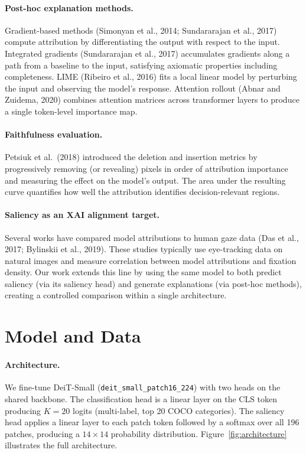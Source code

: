 \documentclass{article}
\begin{document}
\paragraph{Post-hoc explanation methods.}
Gradient-based methods (Simonyan et al., 2014; Sundararajan et al., 2017) compute attribution by differentiating the output with respect to the input. Integrated gradients (Sundararajan et al., 2017) accumulates gradients along a path from a baseline to the input, satisfying axiomatic properties including completeness. LIME (Ribeiro et al., 2016) fits a local linear model by perturbing the input and observing the model's response. Attention rollout (Abnar and Zuidema, 2020) combines attention matrices across transformer layers to produce a single token-level importance map.

\paragraph{Faithfulness evaluation.}
Petsiuk et al.\ (2018) introduced the deletion and insertion metrics by progressively removing (or revealing) pixels in order of attribution importance and measuring the effect on the model's output. The area under the resulting curve quantifies how well the attribution identifies decision-relevant regions.

\paragraph{Saliency as an XAI alignment target.}
Several works have compared model attributions to human gaze data (Das et al., 2017; Bylinskii et al., 2019). These studies typically use eye-tracking data on natural images and measure correlation between model attributions and fixation density. Our work extends this line by using the same model to both predict saliency (via its saliency head) and generate explanations (via post-hoc methods), creating a controlled comparison within a single architecture.

\section{Model and Data}

\paragraph{Architecture.}
We fine-tune DeiT-Small (\texttt{deit\_small\_patch16\_224}) with two heads on the shared backbone. The classification head is a linear layer on the CLS token producing $K\!=\!20$ logits (multi-label, top 20 COCO categories). The saliency head applies a linear layer to each patch token followed by a softmax over all 196 patches, producing a $14\!\times\!14$ probability distribution. Figure~\ref{fig:architecture} illustrates the full architecture.
\end{document}
